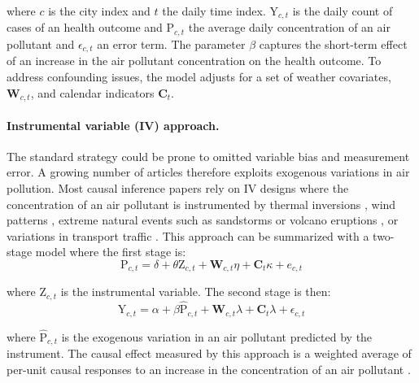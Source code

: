 \documentclass[12pt]{article}
\begin{document}
        \noindent where $c$ is the city index and $t$ the daily time index. $\text{Y}_{c,t}$ is the daily count of cases of an health outcome and $\text{P}_{c,t}$ the average daily concentration of an air pollutant and $\epsilon_{c,t}$ an error term. The parameter $\beta$ captures the short-term effect of an increase in the air pollutant concentration on the health outcome. To address confounding issues, the model adjusts for a set of weather covariates,  $\textbf{W}_{c,t}$, and calendar indicators $\textbf{C}_{t}$. 
        
        \begin{sloppypar}
        \paragraph{Instrumental variable (IV) approach.} The standard strategy could be prone to omitted variable bias and measurement error. A growing number of articles therefore exploits exogenous variations in air pollution. Most causal inference papers rely on IV designs where the concentration of an air pollutant is instrumented by thermal inversions \citep{arceo_does_2016}, wind patterns \citep{schwartz_national_2018, deryugina_mortality_2019}, extreme natural events such as sandstorms or volcano eruptions \citep{ebenstein_particulate_2015, halliday_vog_2019}, or variations in transport traffic \citep{moretti_pollution_2011, knittel_caution_2016, schlenker_airports_2016}. This approach can be summarized with a two-stage model where the first stage is: 
        ~
        \begin{equation}
        \text{P}_{c,t} = \delta + \theta\text{Z}_{c,t} + \textbf{W}_{c,t}\eta + \textbf{C}_{t}\kappa + e_{c,t}
        \end{equation}
        \end{sloppypar}
        
        \noindent where $\text{Z}_{c,t}$ is the instrumental variable. The second stage is then:
        ~
        \begin{equation}
        \text{Y}_{c,t} = \alpha + \beta\widehat{\text{P}}_{c,t} + \textbf{W}_{c,t}\lambda + \textbf{C}_{t}\lambda + \epsilon_{c,t}
        \end{equation}
        
        \noindent where $\widehat{\text{P}}_{c,t}$ is the exogenous variation in an air pollutant predicted by the instrument. The causal effect measured by this approach is a weighted average of per-unit causal responses to an increase in the concentration of an air pollutant \citep{angrist_two-stage_1995}.
\end{document}
